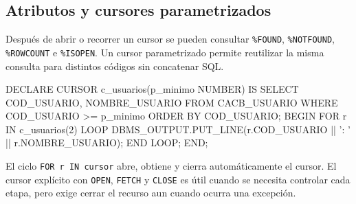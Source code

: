 \documentclass[10pt,letterpaper]{article}
\begin{document}
\subsection{Atributos y cursores parametrizados}
Después de abrir o recorrer un cursor se pueden consultar \texttt{\%FOUND},
\texttt{\%NOTFOUND}, \texttt{\%ROWCOUNT} e \texttt{\%ISOPEN}. Un cursor parametrizado
permite reutilizar la misma consulta para distintos códigos sin concatenar SQL.
\begin{sqlexample}
DECLARE
  CURSOR c_usuarios(p_minimo NUMBER) IS
    SELECT COD_USUARIO, NOMBRE_USUARIO
      FROM CACB_USUARIO
     WHERE COD_USUARIO >= p_minimo
     ORDER BY COD_USUARIO;
BEGIN
  FOR r IN c_usuarios(2) LOOP
    DBMS_OUTPUT.PUT_LINE(r.COD_USUARIO || ': ' || r.NOMBRE_USUARIO);
  END LOOP;
END;
\end{sqlexample}
El ciclo \texttt{FOR r IN cursor} abre, obtiene y cierra automáticamente el
cursor. El cursor explícito con \texttt{OPEN}, \texttt{FETCH} y \texttt{CLOSE} es
útil cuando se necesita controlar cada etapa, pero exige cerrar el recurso aun
cuando ocurra una excepción.
\end{document}
